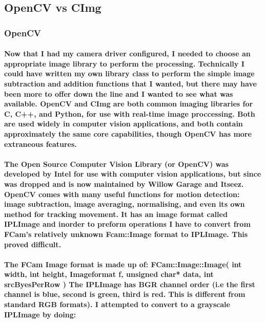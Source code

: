 \documentclass[11pt]{article} %
\begin{document}
\subsection{OpenCV vs CImg}
\subsubsection{OpenCV}
\paragraph{Now that I had my camera driver configured, I needed to choose an appropriate image library to perform the processing. Technically I could have written my own library class to perform the simple image subtraction and addition functions that I wanted, but there may have been more to offer down the line and I wanted to see what was available. OpenCV and CImg are both common imaging libraries for C, C++, and Python, for use with real-time image proccessing.  Both are used widely in computer vision applications, and both contain approximately the same core capabilities, though OpenCV has more extraneous features.}
\paragraph{The Open Source Computer Vision Library (or OpenCV) was developed by Intel for use with computer vision applications, but since was dropped and is now maintained by Willow Garage and Itseez.
\\OpenCV comes with many useful functions for motion detection: image subtraction, image averaging, normalising, and even its own method for tracking movement. It has an image format called IPLImage and inorder to preform operations I have to convert from FCam's relatively unknown Fcam::Image format to IPLImage. This proved difficult.
}
\paragraph{The FCam Image format is made up of:
FCam::Image::Image(
     int width,
     int height,
     Imageformat f,
     unsigned char* data,
     int srcByesPerRow
)
The IPLImage has BGR channel order (i.e the first channel is blue, second is green, third is red. This is different from standard RGB formats). I attempted to convert to a grayscale IPLImage by doing:}
\begin{frame}[fragile]

\end{frame}
\end{document}
